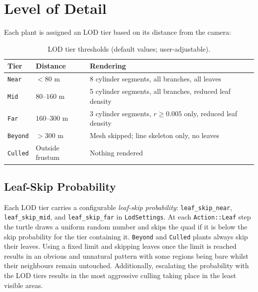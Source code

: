 \section{Level of Detail}
\label{sec:lod}

Each plant is assigned an LOD tier based on its distance from the camera:

\begin{table}[h]
\centering
\begin{tabular}{|l|l|l|l|}
  \hline
  \textbf{Tier}   & \textbf{Distance} & \textbf{Rendering} \\
  \hline
  \texttt{Near}   & $<80$ m           & 8 cylinder segments, all branches, all leaves \\
  \texttt{Mid}    & $80$--$160$ m     & 5 cylinder segments, all branches, reduced leaf density \\
  \texttt{Far}    & $160$--$300$ m    & 3 cylinder segments, $r \geq 0.005$ only, reduced leaf density \\
  \texttt{Beyond} & $>300$ m          & Mesh skipped; line skeleton only, no leaves \\
  \texttt{Culled} & Outside frustum   & Nothing rendered \\
  \hline
\end{tabular}
\caption{LOD tier thresholds (default values; user-adjustable).}
\label{tab:lod}
\end{table}

\subsection{Leaf-Skip Probability}

Each LOD tier carries a configurable \emph{leaf-skip probability}: \texttt{leaf\_skip\_near},
\texttt{leaf\_skip\_mid}, and \texttt{leaf\_skip\_far} in \texttt{LodSettings}. At each
\texttt{Action::Leaf} step the turtle draws a uniform random number and skips the quad if it is below
the skip probability for the tier containing it. \texttt{Beyond} and \texttt{Culled} plants always skip
their leaves. Using a fixed limit and skipping leaves once the limit is reached results in an obvious and
unnatural pattern with some regions being bare whilst their neighbours remain untouched. Additionally,
escalating the probability with the LOD tiers results in the most aggressive culling taking place in the
least visible areas.

